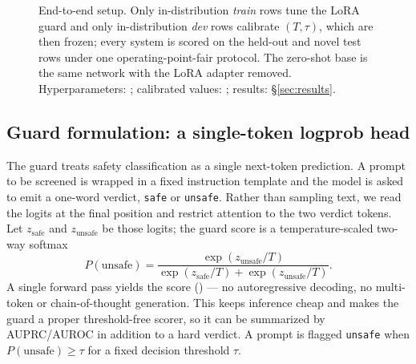 \documentclass[sigconf,nonacm]{acmart}
\begin{document}
\begin{figure}[t]
{%
}
\caption{End-to-end setup. Only in-distribution \emph{train} rows tune the LoRA guard and only in-distribution \emph{dev} rows calibrate $(T,\tau)$, which are then frozen; every system is scored on the held-out and novel test rows under one operating-point-fair protocol. The zero-shot base is the same network with the LoRA adapter removed. Hyperparameters: ; calibrated values: ; results: \S\ref{sec:results}.}
\label{fig:pipeline}
\end{figure}

\subsection{Guard formulation: a single-token logprob head}

The guard treats safety classification as a single next-token prediction. A prompt to be screened is wrapped in a fixed instruction template and the model is asked to emit a one-word verdict, \texttt{safe} or \texttt{unsafe}. Rather than sampling text, we read the logits at the final position and restrict attention to the two verdict tokens. Let $z_{\text{safe}}$ and $z_{\text{unsafe}}$ be those logits; the guard score is a temperature-scaled two-way softmax
\begin{equation}
P(\text{unsafe}) = \frac{\exp(z_{\text{unsafe}}/T)}{\exp(z_{\text{safe}}/T) + \exp(z_{\text{unsafe}}/T)}.
\end{equation}
A single forward pass yields the score () --- no autoregressive decoding, no multi-token or chain-of-thought generation. This keeps inference cheap and makes the guard a proper threshold-free scorer, so it can be summarized by AUPRC/AUROC in addition to a hard verdict. A prompt is flagged \texttt{unsafe} when $P(\text{unsafe}) \ge \tau$ for a fixed decision threshold $\tau$.
\end{document}
